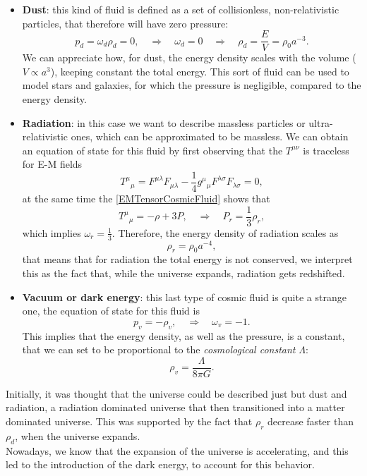 \begin{itemize}
    \item \textbf{Dust}: this kind of fluid is defined as a set of collisionless, non-relativistic particles, that therefore will have zero pressure:$$p_d=\omega_d\rho_d=0,\quad\Rightarrow\quad \omega_d=0\quad\Rightarrow\quad\rho_d=\frac{E}{V}=\rho_{0}a^{-3}.$$ We can appreciate how, for dust, the energy density scales with the volume ($V \propto  a^3$), keeping constant the total energy. This sort of fluid can be used to model stars and galaxies, for which the pressure is negligible, compared to the energy density.
    \item \textbf{Radiation}: in this case we want to describe massless particles or ultra-relativistic ones, which can be approximated to be massless. We can obtain an equation of state for this fluid by first observing that the $T^{\mu\nu}$ is traceless for E-M fields $$T^\mu\phantom{}_\mu=F^{\mu\lambda}F_{\mu\lambda}-\frac{1}{4}g^\mu\phantom{}_\mu F^{\lambda\sigma}F_{\lambda\sigma}=0,$$ at the same time the \eqref{EMTensorCosmicFluid} shows that $$T^\mu\phantom{}_\mu=-\rho+3P,\quad\Rightarrow\quad P_r=\frac{1}{3}\rho_r,$$ which implies $\omega_r=\frac{1}{3}$. Therefore, the energy density of radiation scales as$$\rho_r=\rho_0a^{-4},$$ that means that for radiation the total energy is not conserved, we interpret this as the fact that, while the universe expands, radiation gets redshifted.
    \item \textbf{Vacuum or dark energy}: this last type of cosmic fluid is quite a strange one, the equation of state for this fluid is $$p_v=-\rho_v,\quad \Rightarrow\quad \omega_v=-1.$$ This implies that the energy density, as well as the pressure, is a constant, that we can set to be proportional to the \emph{cosmological constant} $\Lambda$: $$\rho_v=\frac{\Lambda}{8\pi G}.$$
\end{itemize}
Initially, it was thought that the universe could be described just but dust and radiation, a radiation dominated universe that then transitioned into a matter dominated universe. This was supported by the fact that $\rho_r$ decrease faster than $\rho_d$, when the universe expands.\\ Nowadays, we know that the expansion of the universe is accelerating, and this led to the introduction of the dark energy, to account for this behavior.
